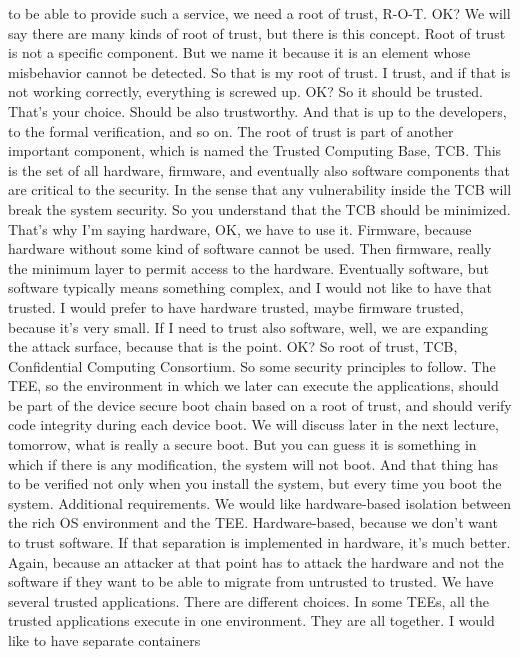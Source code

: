  to be able to provide such a service, we need a root of trust, R-O-T. OK? We
 will say there are many kinds of root of trust, but there is this concept.
 Root of trust is not a specific component. But we name it because it is an
 element whose misbehavior cannot be detected. So that is my root of trust. I
 trust, and if that is not working correctly, everything is screwed up. OK? So
 it should be trusted. That's your choice. Should be also trustworthy. And that
 is up to the developers, to the formal verification, and so on. The root of
 trust is part of another important component, which is named the Trusted
 Computing Base, TCB. This is the set of all hardware, firmware, and eventually
 also software components that are critical to the security. In the sense that
 any vulnerability inside the TCB will break the system security. So you
 understand that the TCB should be minimized. That's why I'm saying hardware,
 OK, we have to use it. Firmware, because hardware without some kind of
 software cannot be used. Then firmware, really the minimum layer to permit
 access to the hardware. Eventually software, but software typically means
 something complex, and I would not like to have that trusted. I would prefer
 to have hardware trusted, maybe firmware trusted, because it's very small. If
 I need to trust also software, well, we are expanding the attack surface,
 because that is the point. OK? So root of trust, TCB, Confidential Computing
 Consortium. So some security principles to follow. The TEE, so the environment
 in which we later can execute the applications, should be part of the device
 secure boot chain based on a root of trust, and should verify code integrity
 during each device boot. We will discuss later in the next lecture, tomorrow,
 what is really a secure boot. But you can guess it is something in which if
 there is any modification, the system will not boot. And that thing has to be
 verified not only when you install the system, but every time you boot the
 system. Additional requirements. We would like hardware-based isolation
 between the rich OS environment and the TEE. Hardware-based, because we don't
 want to trust software. If that separation is implemented in hardware, it's
 much better. Again, because an attacker at that point has to attack the
 hardware and not the software if they want to be able to migrate from
 untrusted to trusted. We have several trusted applications. There are
 different choices. In some TEEs, all the trusted applications execute in one
 environment. They are all together. I would like to have separate containers

